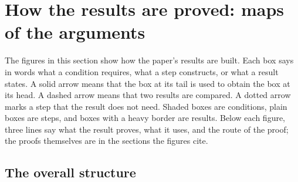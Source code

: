 \section{How the results are proved: maps of the arguments}
\label{app:proof-maps}

The figures in this section show how the paper's results are built. Each box says in
words what a condition requires, what a step constructs, or what a result states. A solid
arrow means that the box at its tail is used to obtain the box at its head. A dashed arrow
means that two results are compared. A dotted arrow marks a step that the result does not
need. Shaded boxes are conditions, plain boxes are steps, and boxes with a heavy border are
results. Below each figure, three lines say what the result proves, what it uses, and the
route of the proof; the proofs themselves are in the sections the figures cite.


\subsection{The overall structure}
\label{app:proof-maps:overall}

